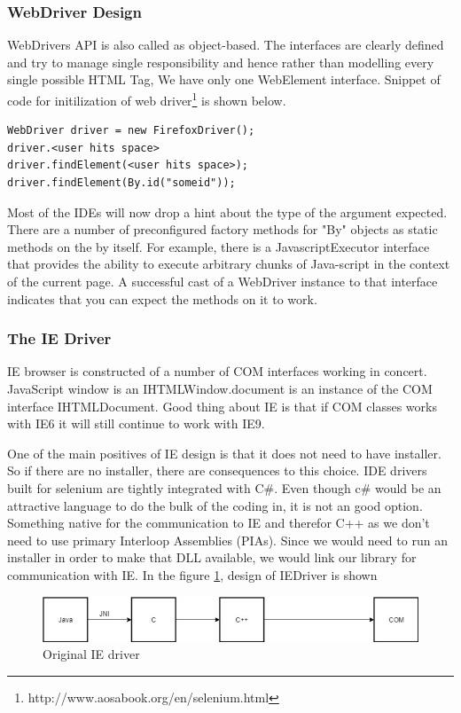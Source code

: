 \documentclass[article,type=msc,colorback,accentcolor=tud9c,twoside,11pt]{tudthesis}
\begin{document}
\subsubsection{WebDriver Design}
WebDrivers API \cite{SeleniumTestingFramework} is also called as  object-based. The interfaces are clearly defined and try to manage single responsibility and hence rather than modelling every single possible HTML Tag, We have only one WebElement interface. Snippet of code for initilization of web driver\footnote{http://www.aosabook.org/en/selenium.html} is shown below.

\begin{lstlisting}
WebDriver driver = new FirefoxDriver();
driver.<user hits space>
driver.findElement(<user hits space>);
driver.findElement(By.id("someid"));
\end{lstlisting}
Most of the IDEs will now drop a hint about the type of the argument expected. There are a number of preconfigured factory methods for "By" objects as static methods on the by itself. For example, there is a JavascriptExecutor interface that provides the ability to execute arbitrary chunks of Java-script in the context of the current page. A successful cast of a WebDriver instance to that interface indicates that you can expect the methods on it to work.


\subsubsection{The IE Driver}
IE browser is constructed of a number of COM interfaces working in concert. JavaScript window is an IHTMLWindow.document is an instance of the COM interface  IHTMLDocument. Good thing about IE is that if COM classes works with IE6 it will still continue to work with IE9.

One of the main positives of IE design is that it does not need to have installer. So if there are no installer, there are consequences to this choice. IDE drivers built for selenium are tightly integrated with C\#. Even though c\# would be an attractive language to do the bulk of the coding in, it is not an good option. Something native for the communication to IE and therefor C++ as we don't need to use primary Interloop Assemblies (PIAs). Since we would need to run an installer in order to make that DLL available, we would link our library for communication with IE. In the figure  \ref{fig:OriginalIEdriver}, design of IEDriver is shown 
\begin{figure}[h]
	\centering
	\includegraphics[scale=0.6]{OriginalIEdriver}
	\caption{Original IE driver}
	\label{fig:OriginalIEdriver}
\end{figure}
\end{document}
